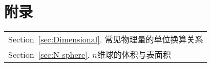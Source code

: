 \part{附录}\label{Part:Appendix}
	
	\begin{margintable}\vspace{1.4in}\footnotesize
		\begin{tabularx}{\marginparwidth}{|X}
		Section~\ref{sec:Dimensional}. 常见物理量的单位换算关系\\
		Section~\ref{sec:N-sphere}. $n$维球的体积与表面积\\
		\end{tabularx}
	\end{margintable}

	


	


			
